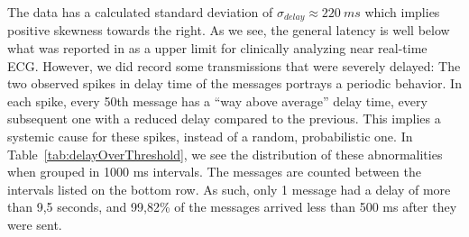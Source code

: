 \begin{table}[]
\centering
\caption{End to end delays larger than given thresholds}
\label{tab:delayOverThreshold}
\end{table}

The data has a calculated standard deviation of $\sigma_{delay} \approx {220}\:ms$ which implies positive skewness towards the right. As we see, the general latency is well below what was reported in \cite{Alesanco:2010kc} as a upper limit for clinically analyzing near real-time ECG. However, we did record some transmissions that were severely delayed: The two observed spikes in delay time of the messages portrays a periodic behavior. In each spike, every 50th message has a ``way above average'' delay time, every subsequent one with a reduced delay compared to the previous. This implies a systemic cause for these spikes, instead of a random, probabilistic one. In Table~\ref{tab:delayOverThreshold}, we see the distribution of these abnormalities when grouped in 1000 ms intervals. The messages are counted between the intervals listed on the bottom row. As such, only 1 message had a delay of more than 9,5 seconds, and 99,82\% of the messages arrived less than 500 ms after they were sent.

